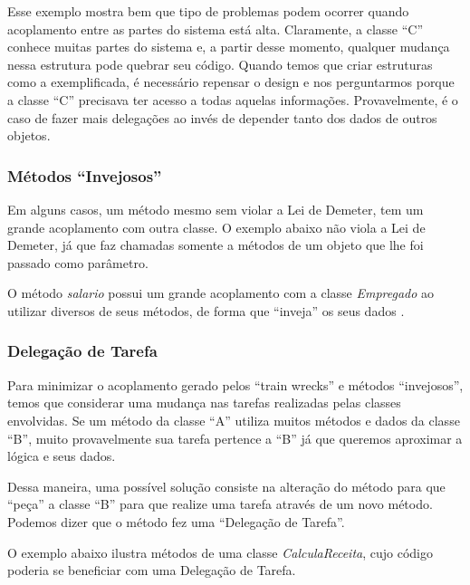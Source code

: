 Esse exemplo mostra bem que tipo de problemas podem ocorrer quando acoplamento entre as partes do sistema está alta. Claramente, a 
classe ``C'' conhece muitas partes do sistema e, a partir desse momento, qualquer mudança nessa estrutura pode quebrar seu código. 
Quando temos que criar estruturas como a exemplificada, é necessário repensar o design e nos perguntarmos porque a classe ``C'' 
precisava ter acesso a todas aquelas informações. Provavelmente, é o caso de fazer mais delegações ao invés de depender tanto dos 
dados de outros objetos.

\subsubsection{Métodos ``Invejosos''}
Em alguns casos, um método mesmo sem violar a Lei de Demeter, tem um grande acoplamento com outra classe.
O exemplo abaixo não viola a Lei de Demeter, já que faz chamadas somente a métodos de um objeto que lhe foi passado como parâmetro.



O método \textit{salario} possui um grande acoplamento com a classe \textit{Empregado} ao utilizar diversos de seus métodos, de forma 
que ``inveja'' os seus dados \citep{Fowler99}.

\subsubsection{Delegação de Tarefa}
Para minimizar o acoplamento gerado pelos ``train wrecks'' e métodos ``invejosos'', temos que considerar uma mudança nas 
tarefas realizadas pelas classes envolvidas. Se um método da classe ``A'' utiliza muitos métodos e dados da classe ``B'', muito 
provavelmente sua tarefa pertence a ``B'' já que queremos aproximar a lógica e seus dados.

Dessa maneira, uma possível solução consiste na alteração do método para que ``peça'' a classe ``B'' para que realize uma tarefa 
através de um novo método. Podemos dizer que o método fez uma ``Delegação de Tarefa''.

O exemplo abaixo ilustra métodos de uma classe \textit{CalculaReceita}, cujo código poderia se beneficiar com uma Delegação de Tarefa.




